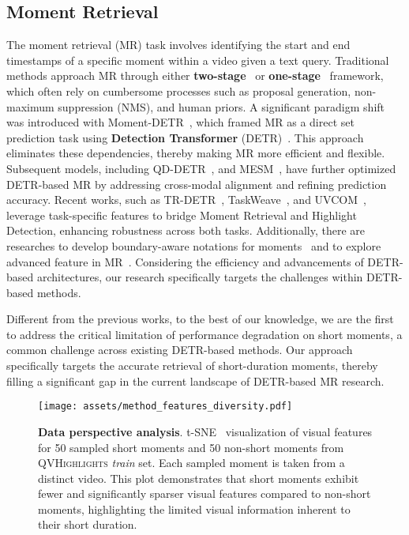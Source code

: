 \subsection{Moment Retrieval}
The moment retrieval (MR) task involves identifying the start and end timestamps of a specific moment within a video given a text query.
Traditional methods approach MR through either \textbf{two-stage}~\cite{anne2017localizing_mcn, hendricks2018localizing_MLLC, zhang2019exploiting_TCMN, zhang2019cross_QSPN, gao2021fast_SAP} or \textbf{one-stage}~\cite{chen2018temporally_tgn, wang2020temporally_cbp, otani2020uncovering_SCDM, Zhang_2019_CVPR_man, hu2021video_CMHN, liu2018temporal_tmn, zhang2020learning_2d_tan} framework, which often rely on cumbersome processes such as proposal generation, non-maximum suppression (NMS), and human priors.
A significant paradigm shift was introduced with Moment-DETR~\cite{lei2021detecting_Moment-DETR}, which framed MR as a direct set prediction task using \textbf{Detection Transformer} (DETR)~\cite{carion2020end_DETR}. 
This approach eliminates these dependencies, thereby making MR more efficient and flexible. Subsequent models, including QD-DETR~\cite{moon2023query_QD-DETR}, and MESM~\cite{liu2024towards_MESM}, have further optimized DETR-based MR by addressing cross-modal alignment and refining prediction accuracy. 
Recent works, such as TR-DETR~\cite{sun2024tr_TR-DETR}, TaskWeave~\cite{zhang2024temporally_TaskWeave}, and UVCOM~\cite{xiao2024bridging_UVCOM}, leverage task-specific features to bridge Moment Retrieval and Highlight Detection, enhancing robustness across both tasks. Additionally, there are researches to develop boundary-aware notations for moments~\cite{lee2025bam-detr} and to explore advanced feature in MR~\cite{liu2024r2-tuning, wang2024internvideo2}. 
Considering the efficiency and advancements of DETR-based architectures, our research specifically targets the challenges within DETR-based methods.

Different from the previous works, to the best of our knowledge, we are the first to address the critical limitation of performance degradation on short moments, a common challenge across existing DETR-based methods. Our approach specifically targets the accurate retrieval of short-duration moments, thereby filling a significant gap in the current landscape of DETR-based MR research.

\begin{figure}[tb]
    \centering
    \texttt{[image: assets/method\_features\_diversity.pdf]}
    \caption{ \textbf{Data perspective analysis}. t-SNE~\cite{van2008tsne} visualization of visual features for 50 sampled short moments and 50 non-short moments from \textsc{QVHighlights} \textit{train} set. Each sampled moment is taken from a distinct video. This plot demonstrates that short moments exhibit fewer and significantly sparser visual features compared to non-short moments, highlighting the limited visual information inherent to their short duration.
    }
    \label{fig:method_feature_diversity}
\end{figure}

